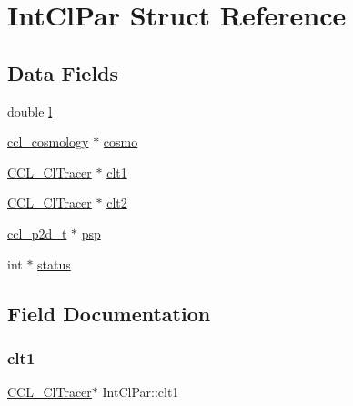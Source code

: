 \hypertarget{struct_int_cl_par}{}\section{Int\+Cl\+Par Struct Reference}
\label{struct_int_cl_par}
\subsection*{Data Fields}
\begin{DoxyCompactItemize}
\item 
double \mbox{\hyperlink{struct_int_cl_par_a588f97b773d94c73dc312e564566069d}{l}}
\item 
\mbox{\hyperlink{structccl__cosmology}{ccl\+\_\+cosmology}} $\ast$ \mbox{\hyperlink{struct_int_cl_par_a23ea5c0ad9cf5813be51906bfe326c7d}{cosmo}}
\item 
\mbox{\hyperlink{struct_c_c_l___cl_tracer}{C\+C\+L\+\_\+\+Cl\+Tracer}} $\ast$ \mbox{\hyperlink{struct_int_cl_par_a6a1d336b42313fbd80f79b3e465f3d7f}{clt1}}
\item 
\mbox{\hyperlink{struct_c_c_l___cl_tracer}{C\+C\+L\+\_\+\+Cl\+Tracer}} $\ast$ \mbox{\hyperlink{struct_int_cl_par_a730347547f437f2de5e1dac6791f0b02}{clt2}}
\item 
\mbox{\hyperlink{structccl__p2d__t}{ccl\+\_\+p2d\+\_\+t}} $\ast$ \mbox{\hyperlink{struct_int_cl_par_a6fd01be704421f0c26ad9030cf798f1a}{psp}}
\item 
int $\ast$ \mbox{\hyperlink{struct_int_cl_par_abc2ccba43ee24664930d4471badeba83}{status}}
\end{DoxyCompactItemize}


\subsection{Field Documentation}
\mbox{\label{struct_int_cl_par_a6a1d336b42313fbd80f79b3e465f3d7f}} 
\subsubsection{\texorpdfstring{clt1}{clt1}}
{\footnotesize\ttfamily \mbox{\hyperlink{struct_c_c_l___cl_tracer}{C\+C\+L\+\_\+\+Cl\+Tracer}}$\ast$ Int\+Cl\+Par\+::clt1}

\mbox{\label{struct_int_cl_par_a730347547f437f2de5e1dac6791f0b02}} 

